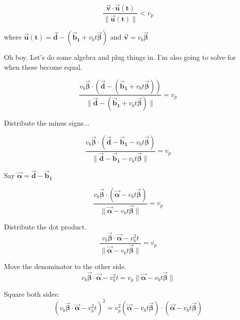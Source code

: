 \documentclass[11pt]{article} %
\begin{document}
$$\frac{\bm{\vec{v}} \cdot \bm{\vec{u}(t)}}{\|\bm{\vec{u}(t)}\|}  < v_p$$

where $\bm{\vec{u}(t)} = \bm{\vec{d}} - (\bm{\vec{b}_1} + v_b t\bm{\vec{\beta}})$ and $\bm{\vec{v}} =  v_b\bm{\vec{\beta}}$

Oh boy. Let's do some algebra and plug things in. I'm also going to solve for when these become equal. 


$$\frac{  v_b\bm{\vec{\beta}}  \cdot    (\bm{\vec{d}} - (\bm{\vec{b}_1} + v_b t\bm{\vec{\beta}}))  }{\|  \bm{\vec{d}} - (\bm{\vec{b}_1} + v_b t\bm{\vec{\beta}})  \|}  = v_p$$

Distribute the minus signs...

$$\frac{  v_b\bm{\vec{\beta}}  \cdot    (\bm{\vec{d}} - \bm{\vec{b}_1} - v_b t\bm{\vec{\beta}})  }{\|  \bm{\vec{d}} - \bm{\vec{b}_1} - v_b t\bm{\vec{\beta}}  \|}  = v_p$$

Say $\bm{\vec{\alpha}} = \bm{\vec{d}} - \bm{\vec{b}_1}$

$$\frac{  v_b\bm{\vec{\beta}}  \cdot    (\bm{\vec{\alpha}} - v_b t\bm{\vec{\beta}})  }{\|  \bm{\vec{\alpha}} - v_b t\bm{\vec{\beta}}  \|}  = v_p$$

Distribute the dot product.
$$\frac{  v_b\bm{\vec{\beta}}  \cdot    \bm{\vec{\alpha}} - v_b^2 t  }{\|  \bm{\vec{\alpha}} - v_b t\bm{\vec{\beta}}  \|}  = v_p$$

Move the denominator to the other side. 
$$ v_b\bm{\vec{\beta}}  \cdot    \bm{\vec{\alpha}} - v_b^2 t  = v_p \|  \bm{\vec{\alpha}} - v_b t\bm{\vec{\beta}}  \|$$

Square both sides:
$$ (v_b\bm{\vec{\beta}}  \cdot    \bm{\vec{\alpha}} - v_b^2 t)^2  = v_p^2  (\bm{\vec{\alpha}} - v_b t\bm{\vec{\beta}}) \cdot (\bm{\vec{\alpha}} - v_b t\bm{\vec{\beta}}) $$
\end{document}
